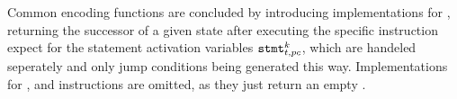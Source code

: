 \noindent
Common encoding functions are concluded by introducing implementations for , returning the successor of a given state after executing the specific instruction expect for the statement activation variables $\texttt{stmt}^k_{t, pc}$, which are handeled seperately and only jump conditions being generated this way.
Implementations for ,  and  instructions are omitted, as they just return an empty .

\newpage


\newcommand{\defencode}[1]{
  \vfill
  \par\noindent
  #1
  \par\noindent
  \rule[0.5\baselineskip]{\textwidth}{0.1pt}%
}

\newlength{\encodeskip}
\setlength{\encodeskip}{.5\baselineskip}



